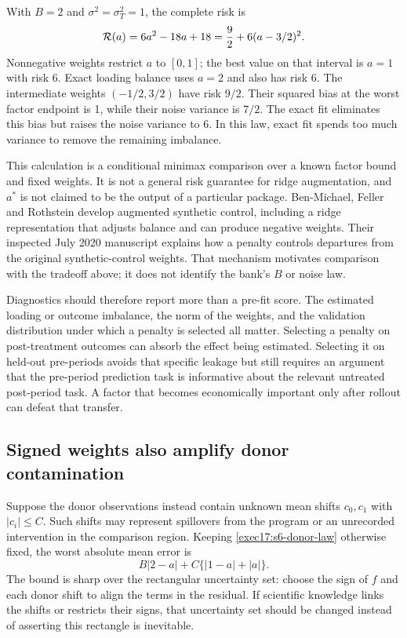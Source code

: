 With $B=2$ and $\sigma^2=\sigma_T^2=1$, the complete risk is
\begin{equation}
 {\cal R}(a)=6a^2-18a+18
            =\frac92+6(a-3/2)^2.
 \label{exec17:s6-donor-square}
\end{equation}
Nonnegative weights restrict $a$ to $[0,1]$; the best value on that
interval is $a=1$ with risk 6. Exact loading balance uses $a=2$
and also has risk 6. The intermediate weights $(-1/2,3/2)$ have
risk $9/2$. Their squared bias at the worst factor endpoint is 1,
while their noise variance is $7/2$. The exact fit eliminates this bias
but raises the noise variance to 6. In this law, exact fit spends too much
variance to remove the remaining imbalance.

This calculation is a conditional minimax comparison over a known factor
bound and fixed weights. It is not a general risk guarantee for ridge
augmentation, and $a^*$ is not claimed to be the output of a particular
package. Ben-Michael, Feller and Rothstein develop augmented synthetic control,
including a ridge representation that adjusts balance and can produce
negative weights. Their inspected July 2020 manuscript explains how a penalty
controls departures from the original synthetic-control weights. That
mechanism motivates comparison with the tradeoff above; it does not identify
the bank's $B$ or noise law.~\citep{benmichael2021}

Diagnostics should therefore report more than a pre-fit score. The
estimated loading or outcome imbalance, the norm of the weights, and the
validation distribution under which a penalty is selected all matter.
Selecting a penalty on post-treatment outcomes can absorb the effect
being estimated. Selecting it on held-out pre-periods avoids that specific
leakage but still requires an argument that the pre-period prediction task
is informative about the relevant untreated post-period task. A factor that
becomes economically important only after rollout can defeat that transfer.

\subsection{Signed weights also amplify donor contamination}

Suppose the donor observations instead contain unknown mean shifts $c_0,c_1$
with $|c_i|\leq C$. Such shifts may represent spillovers from the program
or an unrecorded intervention in the comparison region. Keeping
\eqref{exec17:s6-donor-law} otherwise fixed, the worst absolute mean error is
\begin{equation}
 B|2-a|+C\{|1-a|+|a|\}.
 \label{exec17:s6-contamination-radius}
\end{equation}
The bound is sharp over the rectangular uncertainty set: choose the sign of
$f$ and each donor shift to align the terms in the residual. If scientific
knowledge links the shifts or restricts their signs, that uncertainty set
should be changed instead of asserting this rectangle is inevitable.

